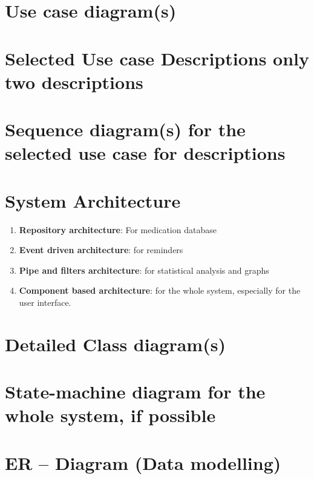 \documentclass[11pt]{article}
\begin{document}
    \section{Use case diagram(s)}\label{sec:use-case-diagram(s)}


    \section{Selected Use case Descriptions {only two descriptions}}\label{sec:selected-use-case-descriptions}


    \section{Sequence diagram(s) {for the selected use case for descriptions}}\label{sec:sequence-diagram(s)}


    \section{System Architecture}\label{sec:system-architecture}

    \begin{enumerate}
        \item \textbf{Repository architecture}: For medication database
        \item \textbf{Event driven architecture}: for reminders
        \item \textbf{Pipe and filters architecture}: for statistical analysis and graphs
        \item \textbf{Component based architecture}: for the whole system, especially for the user interface.
    \end{enumerate}


    \section{Detailed Class diagram(s)}\label{sec:detailed-class-diagram(s)}


    \section{State-machine diagram {for the whole system, if possible}}\label{sec:state-machine-diagram}


    \section{ER – Diagram (Data modelling)}\label{sec:er--diagram-(data-modelling)}
\end{document}
